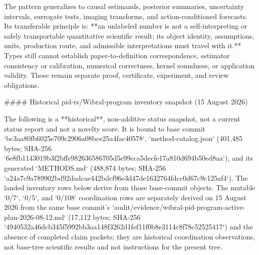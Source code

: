 \documentclass[11pt]{article}
\begin{document}
\begin{markdown}
The pattern generalizes to causal estimands, posterior summaries, uncertainty intervals,
surrogate tests, imaging transforms, and action-conditioned forecasts. Its transferable principle
is: **an unlabeled number is not a self-interpreting or safely transportable quantitative scientific
result; its object identity, assumptions, units, production route, and admissible interpretations
must travel with it.** Types still cannot establish
paper-to-definition correspondence, estimator consistency or calibration, numerical correctness,
kernel soundness, or application validity. Those remain separate proof, certificate, experiment,
and review obligations.

#### Historical pid-rs/Wibral-program inventory snapshot (15 August 2026)

The following is a **historical**, non-additive status snapshot, not a current status report and
not a novelty score. It is bound to base commit
`bc3aa80fb6025e709c2906a08bce25a4fac40578`, `method-catalog.json` (401,485 bytes; SHA-256
`6e8fb1143019b3f2bffe982636586705d5e99cca5decfe17a810d694b50ed8aa`), and its generated
`METHODS.md` (488,874 bytes; SHA-256
`a24a7c9a789902bd92dadcae442bdcf96e3d47de1632764fdcc0d67c9c125af4`).
The landed inventory rows below derive from those base-commit objects. The mutable `0/7`, `0/5`,
and `0/108` coordination rows are separately derived on 15 August 2026 from the same base commit's
`audit/evidence/wibral-pid-program-active-plan-2026-08-12.md` (17,112 bytes; SHA-256
`4940532a46dcb345f5992bb3aa148f3262d1fef11f0b8e3114c8f78c52525417`) and the absence of completed
claim packets; they are historical coordination observations, not base-tree scientific results
and not instructions for the present tree.


\end{markdown}
\end{document}
